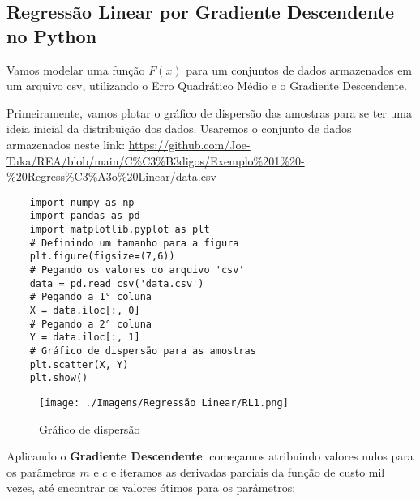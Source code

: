 

\subsection{Regressão Linear por Gradiente Descendente no Python}
Vamos modelar uma função $F(x)$ para um conjuntos de dados armazenados em um arquivo csv, utilizando o Erro Quadrático Médio e o Gradiente Descendente.

Primeiramente, vamos plotar o gráfico de dispersão das amostras para se ter uma ideia inicial da distribuição dos dados. Usaremos o conjunto de dados armazenados neste link:
\url {https://github.com/Joe-Taka/REA/blob/main/C%C3%B3digos/Exemplo%201%20-%20Regress%C3%A3o%20Linear/data.csv}

\begin{verbatim}
	import numpy as np
	import pandas as pd
	import matplotlib.pyplot as plt
	# Definindo um tamanho para a figura
	plt.figure(figsize=(7,6))
	# Pegando os valores do arquivo 'csv'
	data = pd.read_csv('data.csv')
	# Pegando a 1° coluna
	X = data.iloc[:, 0]
	# Pegando a 2° coluna
	Y = data.iloc[:, 1]
	# Gráfico de dispersão para as amostras
	plt.scatter(X, Y)
	plt.show()
\end{verbatim}

\begin{figure}[H]
	\centering
	\texttt{[image: ./Imagens/Regressão Linear/RL1.png]} 
	\caption{Gráfico de dispersão}
	\label{fig:RL1}
\end{figure}

Aplicando o \textbf{Gradiente Descendente}: começamos atribuindo valores nulos para os parâmetros $m$ e $c$ e iteramos as derivadas parciais da função de custo mil vezes, até encontrar os valores ótimos para os parâmetros:

